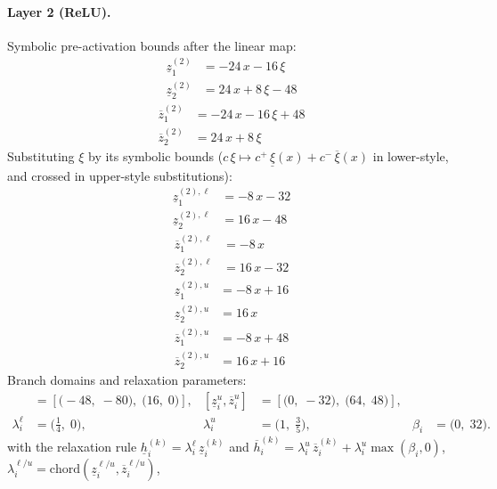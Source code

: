 \documentclass[11pt]{article}
\begin{document}
\paragraph{Layer 2 (ReLU).}
Symbolic pre-activation bounds after the linear map:
\begin{align*}
\underline{z}^{(2)}_{1} &= -24\,x - 16\,\xi \\
\underline{z}^{(2)}_{2} &= 24\,x + 8\,\xi - 48
\end{align*}
\begin{align*}
\overline{z}^{(2)}_{1} &= -24\,x - 16\,\xi + 48 \\
\overline{z}^{(2)}_{2} &= 24\,x + 8\,\xi
\end{align*}
Substituting $\xi$ by its symbolic bounds ($c\,\xi \mapsto c^{+}\,\underline{\xi}(x) + c^{-}\,\overline{\xi}(x)$ in lower-style, and crossed in upper-style substitutions):
\begin{align*}
\underline{z}^{(2),\ell}_{1} &= -8\,x - 32 \\
\underline{z}^{(2),\ell}_{2} &= 16\,x - 48
\end{align*}
\begin{align*}
\overline{z}^{(2),\ell}_{1} &= -8\,x \\
\overline{z}^{(2),\ell}_{2} &= 16\,x - 32
\end{align*}
\begin{align*}
\underline{z}^{(2),u}_{1} &= -8\,x + 16 \\
\underline{z}^{(2),u}_{2} &= 16\,x
\end{align*}
\begin{align*}
\overline{z}^{(2),u}_{1} &= -8\,x + 48 \\
\overline{z}^{(2),u}_{2} &= 16\,x + 16
\end{align*}
Branch domains and relaxation parameters:
\begin{align*}
[\underline{z}^{\ell}_i, \overline{z}^{\ell}_i] &= [\bigl(-48,\; -80\bigr),\; \bigl(16,\; 0\bigr)], & [\underline{z}^{u}_i, \overline{z}^{u}_i] &= [\bigl(0,\; -32\bigr),\; \bigl(64,\; 48\bigr)], \\
\lambda^{\ell}_i &= \bigl(\frac{1}{4},\; 0\bigr), & \lambda^{u}_i &= \bigl(1,\; \frac{3}{5}\bigr), & \beta_i &= \bigl(0,\; 32\bigr).
\end{align*}
with the relaxation rule
$\underline{h}^{(k)}_i = \lambda^{\ell}_i\, \underline{z}^{(k)}_i$ and
$\overline{h}^{(k)}_i = \lambda^{u}_i\, \overline{z}^{(k)}_i + \lambda^{u}_i \max(\beta_i, 0)$,
$\lambda^{\ell/u}_i = \mathrm{chord}(\underline{z}_i^{\ell/u}, \overline{z}_i^{\ell/u})$,
\end{document}
